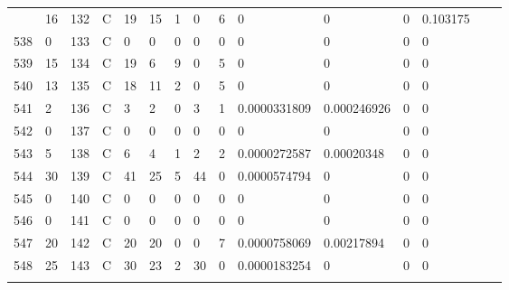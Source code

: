 \begin{longtable}{lllllllllllllll}
\begin{comment}
	537 & 16                & 132 & C   & 19                & 15                & 1                 & 0    & 6          & 0              & 0              & 0             & 0.103175     \\
	538 & 0                 & 133 & C   & 0                 & 0                 & 0                 & 0    & 0          & 0              & 0              & 0             & 0            \\
	539 & 15                & 134 & C   & 19                & 6                 & 9                 & 0    & 5          & 0              & 0              & 0             & 0            \\
	540 & 13                & 135 & C   & 18                & 11                & 2                 & 0    & 5          & 0              & 0              & 0             & 0            \\
	541 & 2                 & 136 & C   & 3                 & 2                 & 0                 & 3    & 1          & 0.0000331809   & 0.000246926    & 0             & 0            \\
	542 & 0                 & 137 & C   & 0                 & 0                 & 0                 & 0    & 0          & 0              & 0              & 0             & 0            \\
	543 & 5                 & 138 & C   & 6                 & 4                 & 1                 & 2    & 2          & 0.0000272587   & 0.00020348     & 0             & 0            \\
	544 & 30                & 139 & C   & 41                & 25                & 5                 & 44   & 0          & 0.0000574794   & 0              & 0             & 0            \\
	545 & 0                 & 140 & C   & 0                 & 0                 & 0                 & 0    & 0          & 0              & 0              & 0             & 0            \\
	546 & 0                 & 141 & C   & 0                 & 0                 & 0                 & 0    & 0          & 0              & 0              & 0             & 0            \\
	547 & 20                & 142 & C   & 20                & 20                & 0                 & 0    & 7          & 0.0000758069   & 0.00217894     & 0             & 0            \\
	548 & 25                & 143 & C   & 30                & 23                & 2                 & 30   & 0          & 0.0000183254   & 0              & 0             & 0            \\

\end{comment}
\end{longtable}
